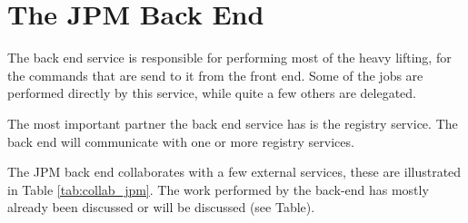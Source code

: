 \section{The JPM Back End}

The back end service is responsible for performing most of the heavy lifting,
for the commands that are send to it from the front end. Some of the jobs
are performed directly by this service, while quite a few others are
delegated.

The most important partner the back end service has is the registry service.
The back end will communicate with one or more registry services.

The JPM back end collaborates with a few external services, these are
illustrated in Table \ref{tab:collab_jpm}. The work performed by the back-end
has mostly already been discussed or will be discussed (see Table).

